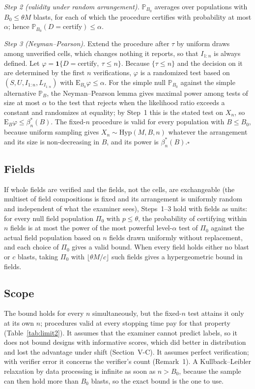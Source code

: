 \documentclass[journal]{IEEEtran}
\newcommand{\Prb}{\mathbb{P}}
\begin{document}
\emph{Step 2 (validity under random arrangement).} $\Prb_{B_0}$ averages over populations with $B_0\le\theta M$ blasts, for each of which the procedure certifies with probability at most $\alpha$; hence $\Prb_{B_0}(D=\text{certify})\le\alpha$.

\emph{Step 3 (Neyman--Pearson).} Extend the procedure after $\tau$ by uniform draws among unverified cells, which changes nothing it reports, so that $I_{1:n}$ is always defined. Let $\varphi=\mathbf 1\{D=\text{certify},\ \tau\le n\}$. Because $\{\tau\le n\}$ and the decision on it are determined by the first $n$ verifications, $\varphi$ is a randomized test based on $(S,U,I_{1:n},L_{I_{1:n}})$ with $\mathrm E_{B_0}\varphi\le\alpha$. For the simple null $\Prb_{B_0}$ against the simple alternative $\Prb_B$, the Neyman--Pearson lemma \cite{lehmann2005tsh} gives maximal power among tests of size at most $\alpha$ to the test that rejects when the likelihood ratio exceeds a constant and randomizes at equality; by Step~1 this is the stated test on $X_n$, so $\mathrm E_B\varphi\le\beta^*_n(B)$. The fixed-$n$ procedure is valid for every population with $B\le B_0$, because uniform sampling gives $X_n\sim\mathrm{Hyp}(M,B,n)$ whatever the arrangement and its size is non-decreasing in $B$, and its power is $\beta^*_n(B)$.\hfill$\square$

\subsection{Fields}
If whole fields are verified and the fields, not the cells, are exchangeable (the multiset of field compositions is fixed and its arrangement is uniformly random and independent of what the examiner sees), Steps~1--3 hold with fields as units: for every null field population $\Pi_0$ with $p\le\theta$, the probability of certifying within $n$ fields is at most the power of the most powerful level-$\alpha$ test of $\Pi_0$ against the actual field population based on $n$ fields drawn uniformly without replacement, and each choice of $\Pi_0$ gives a valid bound. When every field holds either no blast or $c$ blasts, taking $\Pi_0$ with $\lfloor\theta M/c\rfloor$ such fields gives a hypergeometric bound in fields.

\subsection{Scope}
The bound holds for every $n$ simultaneously, but the fixed-$n$ test attains it only at its own $n$; procedures valid at every stopping time pay for that property (Table~\ref{tab:limit2}). It assumes that the examiner cannot predict labels, so it does not bound designs with informative scores, which did better in distribution and lost the advantage under shift (Section~V-C). It assumes perfect verification; with verifier error it concerns the verifier's count (Remark~1). A Kullback--Leibler relaxation by data processing is infinite as soon as $n>B_0$, because the sample can then hold more than $B_0$ blasts, so the exact bound is the one to use.
\end{document}
